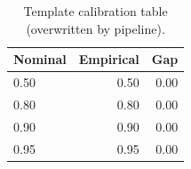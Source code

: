 \begin{table}[h]\centering\begin{tabular}{lrr}\hline
Nominal & Empirical & Gap \\\hline
0.50 & 0.50 & 0.00 \\
0.80 & 0.80 & 0.00 \\
0.90 & 0.90 & 0.00 \\
0.95 & 0.95 & 0.00 \\
\hline\end{tabular}\caption{Template calibration table (overwritten by pipeline).}\end{table}
